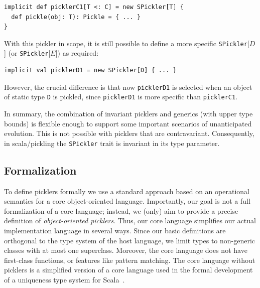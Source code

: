 \documentclass[preprint,10pt]{sigplanconf}
\theoremstyle{definition}
\theoremstyle{definition}
\newcommand{\term}[1]{\mbox{\texttt{#1}}}
\begin{document}
\begin{lstlisting}
implicit def picklerC1[T <: C] = new SPickler[T] {
  def pickle(obj: T): Pickle = { ... }
}
\end{lstlisting}

With this pickler in scope, it is still possible to define a more specific
\term{SPickler}[$D$] (or \term{SPickler}[$E$]) as required:

\begin{lstlisting}
implicit val picklerD1 = new SPickler[D] { ... }
\end{lstlisting}

However, the crucial difference is that now \term{picklerD1} is selected when
an object of static type \term{D} is pickled, since \term{picklerD1} is more
specific than \term{picklerC1}.

In summary, the combination of invariant picklers and generics (with upper
type bounds) is flexible enough to support some important scenarios of
unanticipated evolution. This is not possible with picklers that are
contravariant. Consequently, in scala/pickling the \term{SPickler} trait is
invariant in its type parameter.

\subsection{Formalization}\label{sub:picklers-formal}

To define picklers formally we use a standard approach based on an operational
semantics for a core object-oriented language. Importantly, our goal is not a
full formalization of a core language; instead, we (only) aim to provide a
precise definition of {\em object-oriented picklers}. Thus, our core language
simplifies our actual implementation language in several ways. Since our basic
definitions are orthogonal to the type system of the host language, we limit
types to non-generic classes with at most one superclass. Moreover, the core
language does not have first-class functions, or features like pattern
matching. The core language without picklers is a simplified version of a core
language used in the formal development of a uniqueness type system for
Scala~\cite{HallerO10}.
\end{document}
